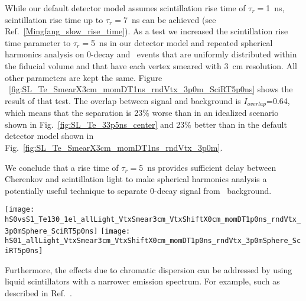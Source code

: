 While our default detector model assumes scintillation rise time of $\tau_r=$1~ns, scintillation rise time up to $\tau_r=$7~ns can 
be achieved (see Ref.~\ref{Mingfang_slow_rise_time}). As a test we increased the scintillation rise time parameter to $\tau_r=$5~ns in 
our detector model and repeated spherical harmonics analysis on 0\nbb-decay and \B~events that are uniformly distributed within the fiducial 
volume and that have each vertex smeared with 3~cm resolution. All other parameters are kept the same.
Figure ~\ref{fig:SL_Te_SmearX3cm_momDT1ns_rndVtx_3p0m_SciRT5p0ns} shows the 
result of that test. The overlap between signal and background is $I_{overlap}$=0.64, which means that the separation is 23\% worse than in
an idealized scenario shown in Fig.~\ref{fig:SL_Te_33p5ns_center} and 23\% better than in the default detector model shown in 
Fig.~\ref{fig:SL_Te_SmearX3cm_momDT1ns_rndVtx_3p0m}.

We conclude that a rise time of $\tau_r=$5~ns provides sufficient delay between
Cherenkov and scintillation light to make spherical harmonics analysis a potentially useful technique to separate 
0\nbb-decay signal from \B~background.

\begin{figure*}[h]
  \centering
  \texttt{[image: hS0vsS1\_Te130\_1el\_allLight\_VtxSmear3cm\_VtxShiftX0cm\_momDT1p0ns\_rndVtx\_3p0mSphere\_SciRT5p0ns]} 
  \texttt{[image: hS01\_allLight\_VtxSmear3cm\_VtxShiftX0cm\_momDT1p0ns\_rndVtx\_3p0mSphere\_SciRT5p0ns]}
  \caption{Scintillation rise time constant is increased to $\tau_r=$5~ns compared to $\tau_r=$1~ns in the default detector model.
    \emph{Left:} Scatter plot of $S_0$ versus $S_1$ for a simulation of 1000 signal (\emph{red crosses}) and background
    (\emph{blue triangles}) events. Event verticies are uniformly distributed within the fiducial volume, $R<3$~m.
    Vertex is smeared with 3~cm resolution. Differential cut of
    $\Delta t=t^{phot}_{measured} - t^{phot}_{predicted}<$1~ns is applied to select early PE sample.
    The default QE and 100\% photo-coverage is used in the simulation.
    Black dashed line corresponds to a linear fit to define 1-D variable $S_{01}$ (see text for details).
    \emph{Right:} Comparison of the $S_{01}$ distribution between signal (\emph{red solid line}) and background (\emph{blue dashed line}).
    $I_{overlap}$=0.64.}
\label{fig:SL_Te_SmearX3cm_momDT1ns_rndVtx_3p0m_SciRT5p0ns}
\end{figure*}


Furthermore, the effects due to chromatic dispersion can be addressed by using liquid scintillators with a narrower emission spectrum. For example,
such as described in Ref.~\cite{LS_narrow_emission}.





